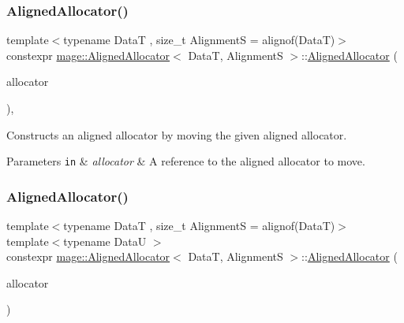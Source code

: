 \subsubsection{\texorpdfstring{Aligned\+Allocator()}{AlignedAllocator()}\hspace{0.1cm}{\footnotesize\ttfamily [3/4]}}
{\footnotesize\ttfamily template$<$typename DataT , size\+\_\+t AlignmentS = alignof(\+Data\+T)$>$ \\
constexpr \hyperlink{classmage_1_1_aligned_allocator}{mage\+::\+Aligned\+Allocator}$<$ DataT, AlignmentS $>$\+::\hyperlink{classmage_1_1_aligned_allocator}{Aligned\+Allocator} (\begin{DoxyParamCaption}\item[{\hyperlink{classmage_1_1_aligned_allocator}{Aligned\+Allocator}$<$ DataT, AlignmentS $>$ \&\&}]{allocator }\end{DoxyParamCaption})\hspace{0.3cm}{\ttfamily [default]}, {\ttfamily [noexcept]}}

Constructs an aligned allocator by moving the given aligned allocator.


\begin{DoxyParams}[1]{Parameters}
\mbox{\tt in}  & {\em allocator} & A reference to the aligned allocator to move. \\
\hline
\end{DoxyParams}
\hypertarget{classmage_1_1_aligned_allocator_a04afd26f90cd17cbfc5134a375e273a9}{}\label{classmage_1_1_aligned_allocator_a04afd26f90cd17cbfc5134a375e273a9} 
\subsubsection{\texorpdfstring{Aligned\+Allocator()}{AlignedAllocator()}\hspace{0.1cm}{\footnotesize\ttfamily [4/4]}}
{\footnotesize\ttfamily template$<$typename DataT , size\+\_\+t AlignmentS = alignof(\+Data\+T)$>$ \\
template$<$typename DataU $>$ \\
constexpr \hyperlink{classmage_1_1_aligned_allocator}{mage\+::\+Aligned\+Allocator}$<$ DataT, AlignmentS $>$\+::\hyperlink{classmage_1_1_aligned_allocator}{Aligned\+Allocator} (\begin{DoxyParamCaption}\item[{\mbox{[}\mbox{[}maybe\+\_\+unused\mbox{]} \mbox{]} const \hyperlink{classmage_1_1_aligned_allocator}{Aligned\+Allocator}$<$ DataU, AlignmentS $>$ \&}]{allocator }\end{DoxyParamCaption})\hspace{0.3cm}{\ttfamily [noexcept]}}

